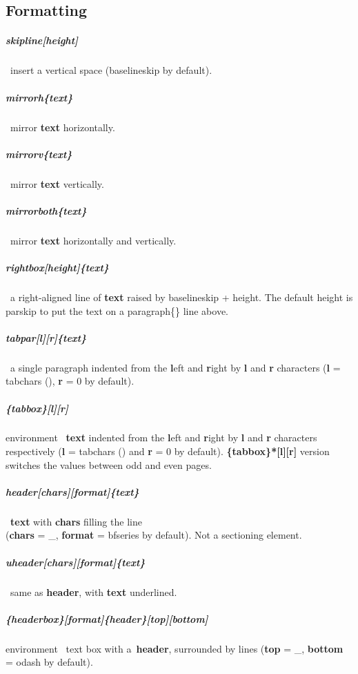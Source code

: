 \documentclass[english,12pt,openany,letterpaper]{book}
\begin{document}
\vfill
\break


\subsection{Formatting}

\subparagraph{\bs skipline[height]} \dash\ insert a vertical space (\bs baselineskip by default).

\skipline

\subparagraph{\bs mirrorh\{text\}} \dash\ mirror \textbf{text} horizontally.

\subparagraph{\bs mirrorv\{text\}} \dash\ mirror \textbf{text} vertically.

\subparagraph{\bs mirrorboth\{text\}} \dash\ mirror \textbf{text} horizontally and vertically.

\skipline

\subparagraph{\bs rightbox[height]\{text\}} \dash\ a right-aligned line of  \textbf{text} raised by \bs baselineskip + height. The default height is \bs parskip to put the text on a \bs paragraph\{\} line above.

\skipline

\subparagraph{\bs tabpar[l][r]\{text\}} \dash\ a single paragraph indented from the \textbf{l}eft and \textbf{r}ight by \textbf{l} and \textbf{r} characters (\textbf{l} = \bs tabchars (\tabchars), \textbf{r} = 0 by default).

\subparagraph{\{tabbox\}[l][r]} environment \dash\ \textbf{text} indented from the \textbf{l}eft and \textbf{r}ight by \textbf{l} and \textbf{r} characters respectively (\textbf{l} = \bs tabchars (\tabchars) and \textbf{r} = 0 by default). \textbf{\{tabbox\}*[l][r]} version switches the values between odd and even pages.

\skipline

\subparagraph{\bs header[chars][format]\{text\}} \dash\ \textbf{text} with \textbf{chars} filling the line
\\(\textbf{chars} = \bs\_, \textbf{format} = \bs bfseries by default). Not a sectioning element.

\subparagraph{\bs uheader[chars][format]\{text\}} \dash\ same as \textbf{\bs header}, with \textbf{text} underlined.

\skipline

\subparagraph{\{headerbox\}[format]\{header\}[top][bottom]} environment \dash\ text box with a~\textbf{header}, surrounded by lines (\textbf{top} = \bs\_, \textbf{bottom} = \bs odash by default).
\end{document}
